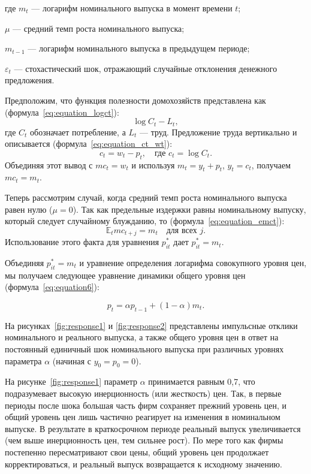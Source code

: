 где $m_t$ — логарифм номинального выпуска в момент времени $t$;
\par
$\mu$ — средний темп роста номинального выпуска;
\par
$m_{t-1}$ — логарифм номинального выпуска в предыдущем периоде;
\par
$\varepsilon_t$ — стохастический шок, отражающий случайные отклонения денежного предложения.

Предположим, что функция полезности домохозяйств представлена как (формула~\eqref{eq:equation_logct}):
\begin{equation}
	\label{eq:equation_logct}
	\log C_t - L_t,
\end{equation}
где \( C_t \) обозначает потребление, а \( L_t \) — труд. Предложение труда вертикально и описывается (формула~\eqref{eq:equation_ct_wt}):
\begin{equation}
	\label{eq:equation_ct_wt}
	c_t = w_t - p_t, \quad \text{где } c_t = \log C_t.
\end{equation}
Объединяя этот вывод с \( mc_t = w_t \) и используя \( m_t = y_t + p_t \), \( y_t = c_t \), получаем \( mc_t = m_t \).

Теперь рассмотрим случай, когда средний темп роста номинального выпуска равен нулю (\( \mu = 0 \)). Так как предельные издержки равны номинальному выпуску, который следует случайному блужданию, то (формула~\eqref{eq:equation_emct}):
\begin{equation}
	\label{eq:equation_emct}
\mathbb{E}_t mc_{t+j} = m_t \quad \text{для всех } j.
\end{equation}
Использование этого факта для уравнения \( p^*_{it} \) дает \( p^*_{it} = m_t \).

Объединяя \( p^*_{it} = m_t \) и уравнение определения логарифма совокупного уровня цен, мы получаем следующее уравнение динамики общего уровня цен (формула~\eqref{eq:equation6}):

\begin{equation}
	\label{eq:equation6}
p_t = \alpha p_{t-1} + (1 - \alpha) m_t.
\end{equation}

На рисунках~\cref{fig:response1} и \cref{fig:response2} представлены импульсные отклики номинального и реального выпуска, а также общего уровня цен в ответ на постоянный единичный шок номинального выпуска при различных уровнях параметра \( \alpha \) (начиная с \( y_0 = p_0 = 0 \)).

На рисунке~\cref{fig:response1} параметр \( \alpha \) принимается равным 0{,}7, что подразумевает высокую инерционность (или жесткость) цен. Так, в первые периоды после шока большая часть фирм сохраняет прежний уровень цен, и общий уровень цен лишь частично реагирует на изменения в номинальном выпуске. В результате в краткосрочном периоде реальный выпуск увеличивается (чем выше инерционность цен, тем сильнее рост). По мере того как фирмы постепенно пересматривают свои цены, общий уровень цен продолжает корректироваться, и реальный выпуск возвращается к исходному значению.

